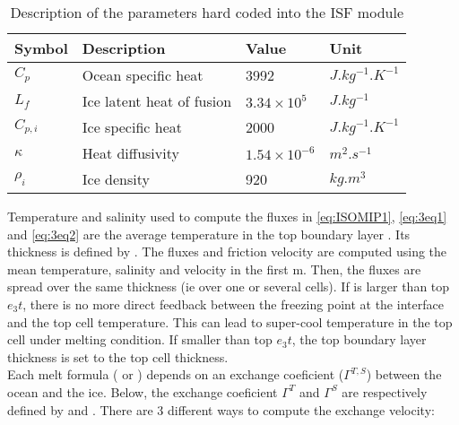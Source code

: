 \documentclass[../main/NEMO_manual]{subfiles}
\begin{document}
     \begin{table}[h]
        \centering
        \caption{Description of the parameters hard coded into the ISF module}
        \label{tab:isf}
        \begin{tabular}{|l|l|l|l|}
        \hline
        Symbol    & Description               & Value              & Unit               \\
        \hline
        $C_p$     & Ocean specific heat       & 3992               & $J.kg^{-1}.K^{-1}$ \\
        $L_f$     & Ice latent heat of fusion & $3.34 \times 10^5$ & $J.kg^{-1}$        \\
        $C_{p,i}$ & Ice specific heat         & 2000               & $J.kg^{-1}.K^{-1}$ \\
        $\kappa$  & Heat diffusivity          & $1.54 \times 10^{-6}$& $m^2.s^{-1}$     \\
        $\rho_i$  & Ice density               & 920                & $kg.m^3$           \\
        \hline
        \end{tabular}
     \end{table}

     Temperature and salinity used to compute the fluxes in \autoref{eq:ISOMIP1}, \autoref{eq:3eq1} and \autoref{eq:3eq2} are the average temperature in the top boundary layer \citep{losch_JGR08}. 
     Its thickness is defined by .
     The fluxes and friction velocity are computed using the mean temperature, salinity and velocity in the first  m.
     Then, the fluxes are spread over the same thickness (ie over one or several cells).
     If  is larger than top $e_{3}t$, there is no more direct feedback between the freezing point at the interface and the top cell temperature.
     This can lead to super-cool temperature in the top cell under melting condition.
     If  smaller than top $e_{3}t$, the top boundary layer thickness is set to the top cell thickness.\\

     Each melt formula ( or ) depends on an exchange coeficient ($\Gamma^{T,S}$) between the ocean and the ice.
     Below, the exchange coeficient $\Gamma^{T}$ and $\Gamma^{S}$ are respectively defined by  and . 
     There are 3 different ways to compute the exchange velocity:
\end{document}
